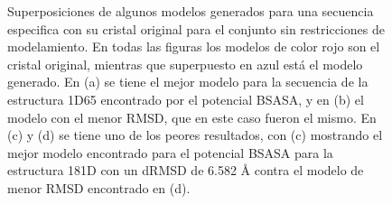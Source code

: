 \begin{figure}[!p]
\caption[Superposiciones con el cristal original de algunos de los mejores modelos de ADN encontrados según los potenciales, para el conjunto generado con restricciones.]{Superposiciones de algunos modelos generados para una secuencia especifica con su cristal original para el conjunto sin restricciones de modelamiento. En todas las figuras los modelos de color rojo son el cristal original, mientras que superpuesto en azul está el modelo generado. En (a) se tiene el mejor modelo para la secuencia de la estructura 1D65 encontrado por el potencial BSASA, y en (b) el modelo con el menor RMSD, que en este caso fueron el mismo. En (c) y (d) se tiene uno de los peores resultados, con (c) mostrando el mejor modelo encontrado para el potencial BSASA para la estructura 181D con un dRMSD de 6.582 \si{\angstrom} contra el modelo de menor RMSD encontrado en (d).}
\label{fig:dnatest1}
\end{figure}

